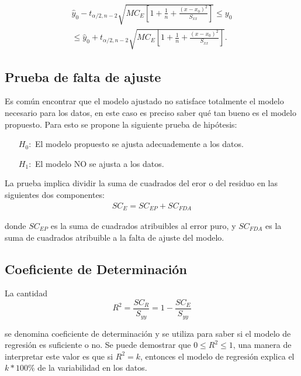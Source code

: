 \begin{itemize}
\begin{enumerate}
\begin{eqnarray*}
\hat{y}_{0}-t_{\alpha/2,n-2}\sqrt{MC_{E}\left[1+\frac{1}{n}+\frac{\left(x-x_{0}\right)^2}{S_{xx}}\right]}\leq y_{0}\\
\leq \hat{y}_{0}+t_{\alpha/2,n-2}\sqrt{MC_{E}\left[1+\frac{1}{n}+\frac{\left(x-x_{0}\right)^2}{S_{xx}}\right]}.
\end{eqnarray*}
\subsection*{Prueba de falta de ajuste}
Es com\'un encontrar que el modelo ajustado no satisface totalmente el modelo necesario para los datos, en este caso es preciso saber qu\'e tan bueno es el modelo propuesto. Para esto se propone la siguiente prueba de hip\'otesis:
\begin{itemize}
\item[$H_{0}:$ ]El modelo propuesto se ajusta adecuademente a los datos.
\item[$H_{1}:$ ]El modelo NO se ajusta a los datos.
\end{itemize}

La prueba implica dividir la suma de cuadrados del eror o del residuo en las siguientes dos componentes:
\begin{eqnarray*}
SC_{E}=SC_{EP}+SC_{FDA}
\end{eqnarray*}

donde $SC_{EP}$ es la suma de cuadrados atribuibles al error puro, y $SC_{FDA}$ es la suma de cuadrados atribuible a la falta de ajuste del modelo.

\subsection*{Coeficiente de Determinaci\'on}
La cantidad
\begin{equation}
R^{2}=\frac{SC_{R}}{S_{yy}}=1-\frac{SC_{E}}{S_{yy}}
\end{equation}

se denomina coeficiente de determinaci\'on y se utiliza para saber si el modelo de regresi\'on es suficiente o no. Se puede demostrar que $0\leq R^{2}\leq1$, una manera de interpretar este valor es que si $R^{2}=k$, entonces el modelo de regresi\'on explica el $k*100\%$ de la variabilidad en los datos.


\end{enumerate}
\end{itemize}
